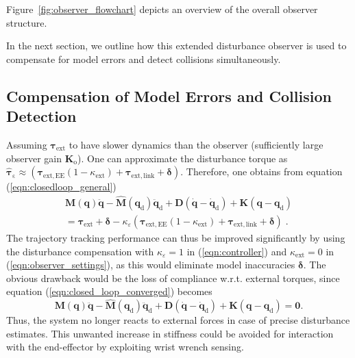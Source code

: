 %
Figure~\ref{fig:observer_flowchart} depicts an overview of the overall observer structure.

In the next section, we outline how this extended disturbance observer is used to compensate for model errors and detect collisions simultaneously. 

\subsection{Compensation of Model Errors and Collision Detection}
\label{sec:friction_comp_and_collDet}

Assuming $\bm{\tau}_\mathrm{ext}$ to have slower dynamics than the observer (sufficiently large observer gain $\bm{K}_{\mathrm{o}}$).
One can approximate the disturbance torque as
\mbox{$\hat{\bm{\tau}}_\mathrm{\varepsilon}\approx
\left(\bm{\tau}_\mathrm{ext,EE}(1-\kappa_{\mathrm{ext}})
+ \bm{\tau}_\mathrm{ext,link}
+ \bm{\delta}
\right)$}.
Therefore, one obtains from equation (\ref{eqn:closedloop_general})
\begin{equation}
\begin{split}
\bm{M(\bm{q})}\ddot{\bm{q}}-\hat{\bm{M}}(\bm{q}_\mathrm{d})\ddot{\bm{q}}_\mathrm{d}
+\bm{D}(\dot{\bm{q}}-\dot{\bm{q}}_\mathrm{d})
+\bm{K}(\bm{q}-\bm{q}_\mathrm{d})\\
= \bm{\tau}_\mathrm{ext}+\bm{\delta}
-\kappa_{\varepsilon}\left(
  \bm{\tau}_\mathrm{ext,EE}(1-\kappa_{\mathrm{ext}})
+ \bm{\tau}_\mathrm{ext,link}
+ \bm{\delta}
\right)\;.
\end{split}
\label{eqn:closed_loop_converged}
\end{equation}
The trajectory tracking performance can thus be improved significantly by using the disturbance compensation with $\kappa_{\varepsilon}=1$ in (\ref{eqn:controller}) and $\kappa_\mathrm{ext}=0$ in (\ref{eqn:observer_settings}), as this would eliminate model inaccuracies $\bm{\delta}$. 
The obvious drawback would be the loss of compliance w.r.t. external torques, since equation (\ref{eqn:closed_loop_converged}) becomes
\begin{equation}
\bm{M(\bm{q})}\ddot{\bm{q}}-\hat{\bm{M}}(\bm{q}_\mathrm{d})\ddot{\bm{q}}_\mathrm{d}
+\bm{D}(\dot{\bm{q}}-\dot{\bm{q}}_\mathrm{d})
+\bm{K}(\bm{q}-\bm{q}_\mathrm{d})
= \bm{0}.
\label{eqn:compLoss}
\end{equation}
Thus, the system no longer reacts to external forces in case of precise disturbance estimates. 
This unwanted increase in stiffness could be avoided for interaction with the end-effector by exploiting wrist wrench sensing.
